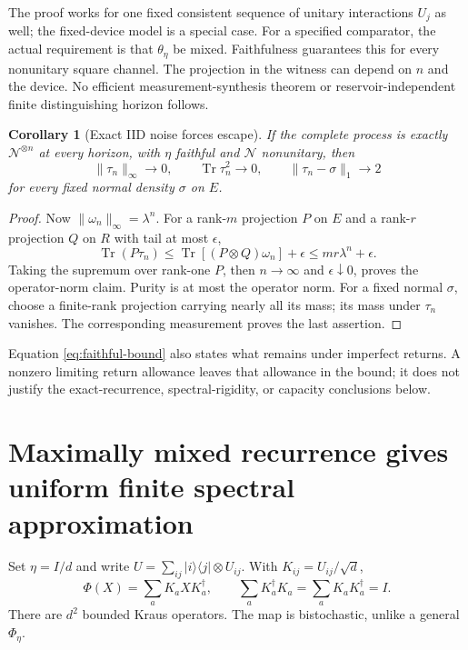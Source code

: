 \documentclass[11pt]{article}
\newtheorem{corollary}[theorem]{Corollary}
\theoremstyle{definition}\newtheorem{definition}[theorem]{Definition}
\newcommand{\Tr}{\operatorname{Tr}}
\newcommand{\cN}{\mathcal N}
\newcommand{\ket}[1]{\lvert #1\rangle}
\newcommand{\bra}[1]{\langle #1\rvert}
\newcommand{\norm}[1]{\lVert #1\rVert}
\begin{document}
The proof works for one fixed consistent sequence of unitary interactions $U_j$ as well; the fixed-device model is a special case. For a specified comparator, the actual requirement is that $\theta_\eta$ be mixed. Faithfulness guarantees this for every nonunitary square channel. The projection in the witness can depend on $n$ and the device. No efficient measurement-synthesis theorem or reservoir-independent finite distinguishing horizon follows.

\begin{corollary}[Exact IID noise forces escape]\label{cor:escape}
If the complete process is exactly $\cN^{\otimes n}$ at every horizon, with $\eta$ faithful and $\cN$ nonunitary, then
\[
 \norm{\tau_n}_\infty\to0,\qquad
 \Tr\tau_n^2\to0,\qquad
 \norm{\tau_n-\sigma}_1\to2
\]
for every fixed normal density $\sigma$ on $E$.
\end{corollary}
\begin{proof}
Now $\norm{\omega_n}_\infty=\lambda^n$. For a rank-$m$ projection $P$ on $E$ and a rank-$r$ projection $Q$ on $R$ with tail at most $\epsilon$,
\[
 \Tr(P\tau_n)\le \Tr[(P\otimes Q)\omega_n]+\epsilon
 \le mr\lambda^n+\epsilon.
\]
Taking the supremum over rank-one $P$, then $n\to\infty$ and $\epsilon\downarrow0$, proves the operator-norm claim. Purity is at most the operator norm. For a fixed normal $\sigma$, choose a finite-rank projection carrying nearly all its mass; its mass under $\tau_n$ vanishes. The corresponding measurement proves the last assertion.
\end{proof}

Equation \eqref{eq:faithful-bound} also states what remains under imperfect returns. A nonzero limiting return allowance leaves that allowance in the bound; it does not justify the exact-recurrence, spectral-rigidity, or capacity conclusions below.

\section{Maximally mixed recurrence gives uniform finite spectral approximation}

Set $\eta=I/d$ and write $U=\sum_{ij}\ket{i}\bra{j}\otimes U_{ij}$. With $K_{ij}=U_{ij}/\sqrt d$,
\[
 \Phi(X)=\sum_a K_aXK_a^\dagger,
 \qquad \sum_a K_a^\dagger K_a=\sum_a K_aK_a^\dagger=I.
\]
There are $d^2$ bounded Kraus operators. The map is bistochastic, unlike a general $\Phi_\eta$.
\end{document}
